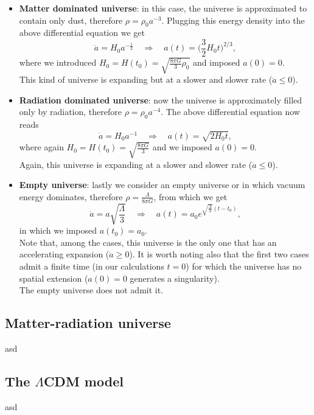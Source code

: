 \begin{itemize}
    \item \textbf{Matter dominated universe}: in this case, the universe is approximated to contain only dust, therefore $\rho=\rho_0a^{-3}$. Plugging this energy density into the above differential equation we get$$\dot a=H_0a^{-\frac{1}{2}}\quad \Rightarrow\quad a(t)=\bigg(\frac{3}{2}H_0t\bigg)^{2/3},$$ where we introduced $H_0=H(t_0)=\sqrt{\frac{8\pi G}{3}\rho_0}$ and imposed $a(0)=0$.\\ This kind of universe is expanding but at a slower and slower rate ($\ddot a\leq0$).
    \item  \textbf{Radiation dominated universe}: now the universe is approximately filled only by radiation, therefore $\rho=\rho_0a^{-4}$. The above differential equation now reads$$\dot a=H_0a^{-1}\quad \Rightarrow\quad a(t)=\sqrt{2H_0t},$$ where again $H_0=H(t_0)=\sqrt{\frac{8\pi G}{3}}$ and we imposed $a(0)=0$.\\ Again, this universe is expanding at a slower and slower rate ($\ddot a\leq0$).
    \item \textbf{Empty universe}: lastly we consider an empty universe or in which vacuum energy dominates, therefore $\rho=\frac{\Lambda}{8\pi G}$, from which we get$$\dot a=a\sqrt{\frac{\Lambda}{3}}\quad \Rightarrow\quad a(t)=a_0e^{\sqrt{\frac{\Lambda}{3}}(t-t_0)},$$
     in which we imposed $a(t_0)=a_0$.\\Note that, among the cases, this universe is the only one that has an accelerating expansion ($\ddot a\geq0$). It is worth noting also that the first two cases admit a finite time (in our calculations $t=0$) for which the universe has no spatial extension ($a(0)=0$ generates a singularity).\\ The empty universe does not admit it. 
\end{itemize}
\subsection{Matter-radiation universe}
asd
\subsection{The $\Lambda$CDM model} 
asd